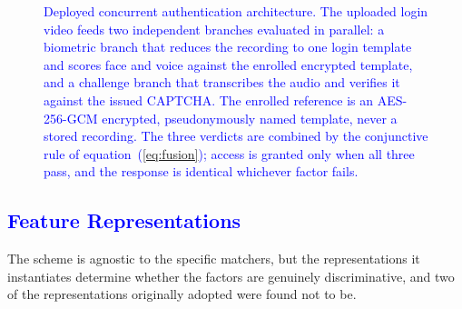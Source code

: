 \documentclass[10pt,journal,compsoc]{IEEEtran}
\begin{document}
{\begin{figure}[!htbp]
\centering
{}
\caption{\textcolor{blue}{Deployed concurrent authentication architecture. The uploaded login video feeds two independent branches evaluated in parallel: a biometric branch that reduces the recording to one login template and scores face and voice against the enrolled encrypted template, and a challenge branch that transcribes the audio and verifies it against the issued CAPTCHA. The enrolled reference is an AES-256-GCM encrypted, pseudonymously named template, never a stored recording. The three verdicts are combined by the conjunctive rule of equation~(\ref{eq:fusion}); access is granted only when all three pass, and the response is identical whichever factor fails.}}
\label{fig:concurrent}
\end{figure}

\subsection{\textcolor{blue}{Feature Representations}}\label{sec:features}
The scheme is agnostic to the specific matchers, but the representations it instantiates determine whether the factors are genuinely discriminative, and two of the representations originally adopted were found not to be.

}
\end{document}
